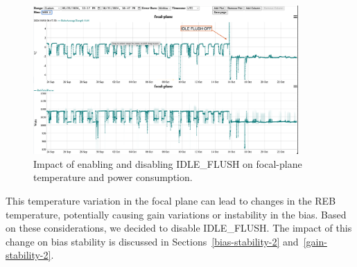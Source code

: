 \begin{figure}
\begin{centering}
\includegraphics[width=0.9\textwidth]{sections/figures/REB_power_temp6_sept24_to_Oct23.png}
\end{centering}
\caption{Impact of enabling and disabling IDLE\_FLUSH on focal-plane temperature and power consumption.}\label{IdleFlushEffect}
\end{figure}

This temperature variation in the focal plane can lead to changes in the REB temperature, potentially causing gain variations or instability in the bias. Based on these considerations, we decided to disable IDLE\_FLUSH. The impact of this change on bias stability is discussed in Sections~\ref{bias-stability-2} and~\ref{gain-stability-2}.

